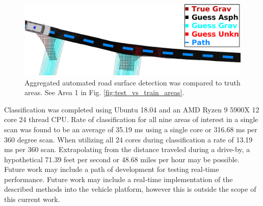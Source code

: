 \documentclass[journal,onecolumn]{IEEEtran}
\begin{document}
		\begin{figure}[H]
			\centering
			\includegraphics[width=0.95\linewidth]{figures/db1_conf_elim_auto_guess_mca}
			\caption[Aggregated Automated Road Surface Detection]{Aggregated automated road surface detection was compared to truth areas. See Area 1 in Fig. \ref{fig:test_vs_train_areas}.}
			\label{fig:guess_grav_intersect}
		\end{figure}
	
		{Classification was completed using Ubuntu 18.04 and an AMD Ryzen 9 5900X 12 core 24 thread CPU. Rate of classification for all nine areas of interest in a single scan was found to be an average of 35.19 ms using a single core or 316.68 ms per 360 degree scan. When utilizing all 24 cores during classification a rate of 13.19 ms per 360 scan. Extrapolating from the distance traveled during a drive-by, a hypothetical 71.39 feet per second or 48.68 miles per hour may be possible. Future work may include a path of development for testing real-time performance. Future work may include a real-time implementation of the described methods into the vehicle platform, however this is outside the scope of this current work. }
		
		
\end{document}
